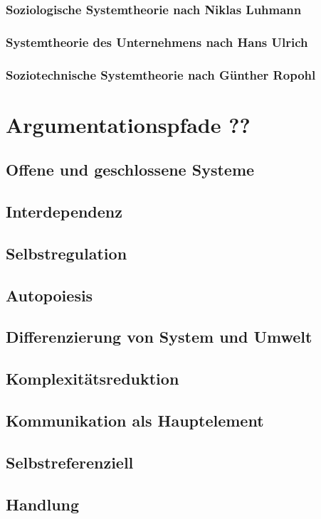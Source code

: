 \documentclass[a4paper,12pt]{article}
\begin{document}
\subsubsection{Soziologische Systemtheorie nach Niklas Luhmann}
\subsubsection{Systemtheorie des Unternehmens nach Hans Ulrich}
\subsubsection{Soziotechnische Systemtheorie nach Günther Ropohl}

\section{Argumentationspfade ??}
\subsection{Offene und geschlossene Systeme}
\subsection{Interdependenz}
\subsection{Selbstregulation}
\subsection{Autopoiesis}
\subsection{Differenzierung von System und Umwelt}
\subsection{Komplexitätsreduktion}
\subsection{Kommunikation als Hauptelement}
\subsection{Selbstreferenziell}
\subsection{Handlung}
\end{document}

